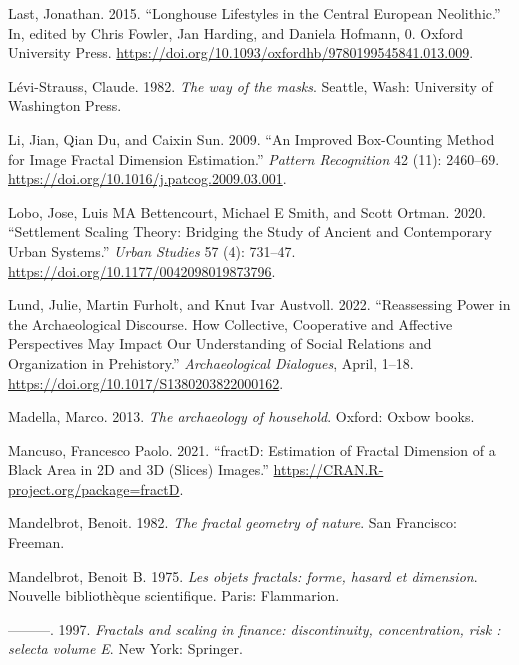\documentclass[
  12pt,
  a4paper, twoside]{book}
\newlength{\cslhangindent}
\newlength{\cslentryspacingunit} %
\newenvironment{CSLReferences}[2] %
 {%
  \setlength{\parindent}{0pt}
  \ifodd #1
  \let\oldpar\par
  \def\par{\hangindent=\cslhangindent\oldpar}
  \fi
  \setlength{\parskip}{#2\cslentryspacingunit}
 }%
 {}
\begin{document}
\begin{CSLReferences}{1}{0}
\leavevmode{}%
Last, Jonathan. 2015. {``Longhouse Lifestyles in the Central European Neolithic.''} In, edited by Chris Fowler, Jan Harding, and Daniela Hofmann, 0. Oxford University Press. \url{https://doi.org/10.1093/oxfordhb/9780199545841.013.009}.

\leavevmode{}%
Lévi-Strauss, Claude. 1982. \emph{The way of the masks}. Seattle, Wash: University of Washington Press.

\leavevmode{}%
Li, Jian, Qian Du, and Caixin Sun. 2009. {``An Improved Box-Counting Method for Image Fractal Dimension Estimation.''} \emph{Pattern Recognition} 42 (11): 2460--69. \url{https://doi.org/10.1016/j.patcog.2009.03.001}.

\leavevmode{}%
Lobo, Jose, Luis MA Bettencourt, Michael E Smith, and Scott Ortman. 2020. {``Settlement Scaling Theory: Bridging the Study of Ancient and Contemporary Urban Systems.''} \emph{Urban Studies} 57 (4): 731--47. \url{https://doi.org/10.1177/0042098019873796}.

\leavevmode{}%
Lund, Julie, Martin Furholt, and Knut Ivar Austvoll. 2022. {``Reassessing Power in the Archaeological Discourse. How Collective, Cooperative and Affective Perspectives May Impact Our Understanding of Social Relations and Organization in Prehistory.''} \emph{Archaeological Dialogues}, April, 1--18. \url{https://doi.org/10.1017/S1380203822000162}.

\leavevmode{}%
Madella, Marco. 2013. \emph{The archaeology of household}. Oxford: Oxbow books.

\leavevmode{}%
Mancuso, Francesco Paolo. 2021. {``fractD: Estimation of Fractal Dimension of a Black Area in 2D and 3D (Slices) Images.''} \url{https://CRAN.R-project.org/package=fractD}.

\leavevmode{}%
Mandelbrot, Benoit. 1982. \emph{The fractal geometry of nature}. San Francisco: Freeman.

\leavevmode{}%
Mandelbrot, Benoit B. 1975. \emph{Les objets fractals: forme, hasard et dimension}. Nouvelle bibliothèque scientifique. Paris: Flammarion.

\leavevmode{}%
---------. 1997. \emph{Fractals and scaling in finance: discontinuity, concentration, risk : selecta volume E}. New York: Springer.


\end{CSLReferences}
\end{document}
